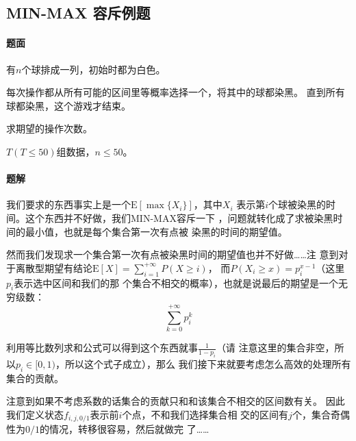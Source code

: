 \subsection{MIN-MAX 容斥例题}
\paragraph{题面}
有$n$个球排成一列，初始时都为白色。\par
每次操作都从所有可能的区间里等概率选择一个，将其中的球都染黑。
直到所有球都染黑，这个游戏才结束。\par
求期望的操作次数。\par
\(T(T\le 50)\)组数据，\(n\le 50\)。
\paragraph{题解}
我们要求的东西事实上是一个$\mathrm{E}[\max\{X_i\}]$，其中$X_i$
表示第$i$个球被染黑的时间。这个东西并不好做，我们MIN-MAX容斥一下
，问题就转化成了求被染黑时间的最小值，也就是每个集合第一次有点被
染黑的时间的期望值。\par
然而我们发现求一个集合第一次有点被染黑时间的期望值也并不好做……注
意到对于离散型期望有结论$\mathrm{E}[X]=\sum_{i = 1}^{+\infty}P(X\geq i)$，
而$P(X_i\geq x) = p_i^{x - 1}$（这里$p_i$表示选中区间和我们的那
个集合不相交的概率），也就是说最后的期望是一个无穷级数：
\[\sum_{k = 0}^{+\infty} p_i^k\]\par
利用等比数列求和公式可以得到这个东西就事$\frac{1}{1 - p_i}$（请
注意这里的集合非空，所以$p_i\in [0,1)$，所以这个式子成立），那么
我们接下来就要考虑怎么高效的处理所有集合的贡献。\par
注意到如果不考虑系数的话集合的贡献只和和该集合不相交的区间数有关。
因此我们定义状态$f_{i, j, 0/1}$表示前$i$个点，不和我们选择集合相
交的区间有$j$个，集合奇偶性为$0/1$的情况，转移很容易，然后就做完
了……